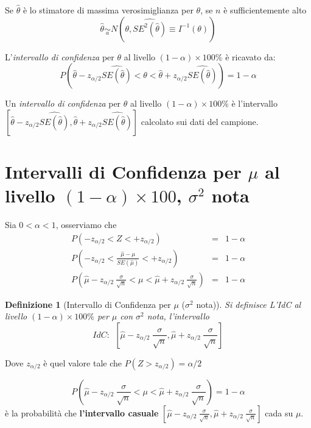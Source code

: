 \documentclass[
  11pt,
]{book}
\theoremstyle{mytheoremstyle}
\theoremstyle{mydefstyle}
\newtheorem{definition}{Definizione}[section]
\begin{document}
Se \(\hat\theta\) è lo stimatore di massima verosimiglianza per \(\theta\), se \(n\) è sufficientemente alto
\[\hat\theta\operatorname*{\sim}_a N(\theta,\widehat{SE^2(\hat\theta)}\equiv I^{-1}(\theta))\]

L'\emph{intervallo di confidenza} per \(\theta\) al livello \((1-\alpha)\times 100\%\) è ricavato da:
\[P(\hat\theta-z_{\alpha/2}\widehat{SE(\hat\theta)}<\theta<\hat\theta+z_{\alpha/2}\widehat{SE(\hat\theta)})=1-\alpha\]

Un \emph{intervallo di confidenza} per \(\theta\) al livello \((1-\alpha)\times 100\%\) è l'intervallo \([\hat\theta-z_{\alpha/2}\widehat{SE(\hat\theta)},\hat\theta+z_{\alpha/2}\widehat{SE(\hat\theta)}]\) calcolato sui dati del campione.

\section{\texorpdfstring{Intervalli di Confidenza per \(\mu\) al livello \((1-\alpha)\times 100\), \(\sigma^2\) nota}{Intervalli di Confidenza per \textbackslash mu al livello (1-\textbackslash alpha)\textbackslash times 100, \textbackslash sigma\^{}2 nota}}\label{intervalli-di-confidenza-per-mu-al-livello-1-alphatimes-100-sigma2-nota}

Sia \(0<\alpha<1\), osserviamo che
\begin{eqnarray*}
  P(-z_{\alpha/2}<Z<+z_{\alpha/2}) &=& 1-\alpha \\
  P\left(-z_{\alpha/2}<\frac{\hat \mu -\mu}{SE(\hat \mu)}< +z_{\alpha/2}\right) &=& 1-\alpha \\
  P\left(\hat \mu- z_{\alpha/2}~\frac\sigma{\sqrt n}<\mu<\hat \mu+z_{\alpha/2}~\frac\sigma{\sqrt n}\right) &=& 1-\alpha
\end{eqnarray*}

\begin{info}

\begin{definition}[Intervallo di Confidenza per $\mu$ ($\sigma^2$ nota)]
Si definisce L'IdC al livello \((1-\alpha)\times100\%\) per \(\mu\) con \(\sigma^2\) nota, l'intervallo
\[IdC:~~\left[\hat \mu- z_{\alpha/2}~\frac\sigma{\sqrt n},\hat \mu+ z_{\alpha/2}~\frac\sigma{\sqrt n}\right]\]
\end{definition}

\end{info}

Dove \(z_{\alpha/2}\) è quel valore tale che \(P(Z>z_{\alpha/2})=\alpha/2\)

\[  P\left(\hat \mu- z_{\alpha/2}~\frac\sigma{\sqrt n}<\mu<\hat \mu+z_{\alpha/2}~\frac\sigma{\sqrt n}\right) = 1-\alpha\]
è la probabilità che \textbf{l'intervallo casuale}
\(\left[\hat \mu- z_{\alpha/2}~\frac\sigma{\sqrt n},\hat \mu+ z_{\alpha/2}~\frac\sigma{\sqrt n}\right]\)
cada su \(\mu\).
\end{document}
